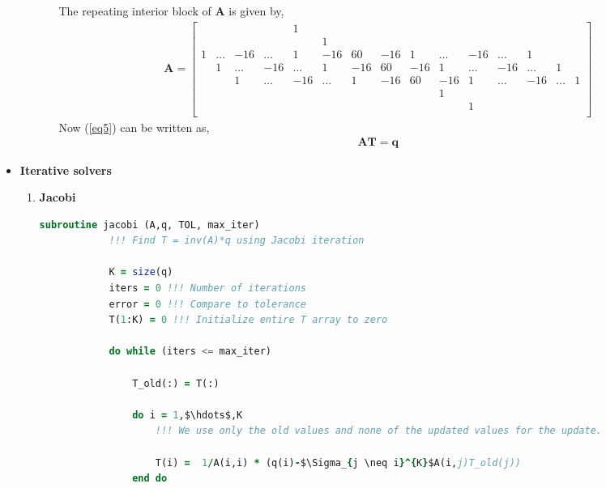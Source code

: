 \documentclass[12 pt, final]{article}
\begin{document}
\begin{itemize}
\begin{itemize}
\begin{enumerate}
            The repeating interior block of $\mathbf{A}$ is given by,
                    \begin{align*}
                    \mathbf{A} = \left[\begin{smallmatrix}
                  &&&&1\\
                  &&&&&1\\ 1&\hdots&-16&\hdots&1&-16&60&-16&1&\hdots&-16&\hdots& 1\\
                    &1&\hdots&-16&\hdots&1&-16&60&-16&1&\hdots&-16&\hdots& 1\\
                    &&1&\hdots&-16&\hdots&1&-16&60&-16&1&\hdots&-16&\hdots& 1\\
                    &&&&&&&&&1\\
                    &&&&&&&&&&1\\
                    \end{smallmatrix}\right]
                \end{align*}
             Now (\ref{eq5}) can be written as,
                \begin{align*}
                    \mathbf{AT} = \mathbf{q}
                \end{align*}
            \end{enumerate}
        \end{itemize}
    \item \textbf{Iterative solvers}
        \begin{enumerate}
            \item \textbf{Jacobi}
            \begin{lstlisting}[language=fortran,mathescape=true]
            subroutine jacobi (A,q, TOL, max_iter)
            !!! Find T = inv(A)*q using Jacobi iteration
            
            K = size(q)
            iters = 0 !!! Number of iterations
            error = 0 !!! Compare to tolerance
            T(1:K) = 0 !!! Initialize entire T array to zero
            
            do while (iters <= max_iter)
            
                T_old(:) = T(:)
                
                do i = 1,$\hdots$,K
                    !!! We use only the old values and none of the updated values for the update.
                    
                    T(i) =  1/A(i,i) * (q(i)-$\Sigma_{j \neq i}^{K}$A(i,j)T_old(j))
                end do
                

\end{lstlisting}
\end{enumerate}
\end{itemize}
\end{document}
